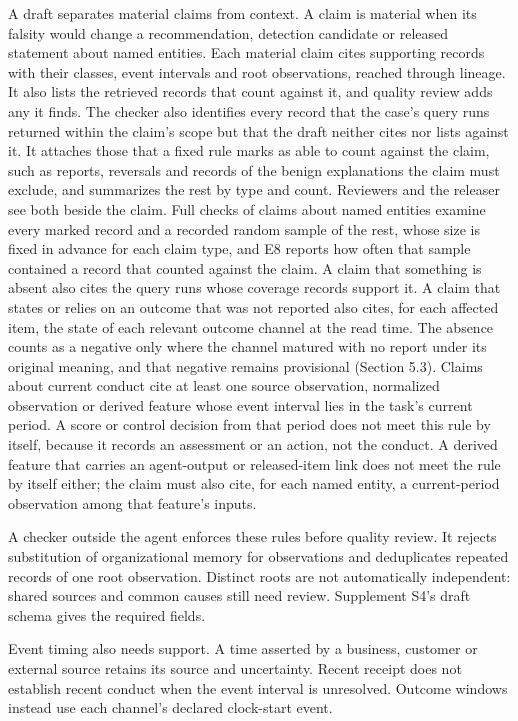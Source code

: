 \documentclass[
  11pt,
]{article}
\begin{document}
A draft separates material claims from context. A claim is material when
its falsity would change a recommendation, detection candidate or
released statement about named entities. Each material claim cites
supporting records with their classes, event intervals and root
observations, reached through lineage. It also lists the retrieved
records that count against it, and quality review adds any it finds. The
checker also identifies every record that the case's query runs returned
within the claim's scope but that the draft neither cites nor lists
against it. It attaches those that a fixed rule marks as able to count
against the claim, such as reports, reversals and records of the benign
explanations the claim must exclude, and summarizes the rest by type and
count. Reviewers and the releaser see both beside the claim. Full checks
of claims about named entities examine every marked record and a
recorded random sample of the rest, whose size is fixed in advance for
each claim type, and E8 reports how often that sample contained a record
that counted against the claim. A claim that something is absent also
cites the query runs whose coverage records support it. A claim that
states or relies on an outcome that was not reported also cites, for
each affected item, the state of each relevant outcome channel at the
read time. The absence counts as a negative only where the channel
matured with no report under its original meaning, and that negative
remains provisional (Section 5.3). Claims about current conduct cite at
least one source observation, normalized observation or derived feature
whose event interval lies in the task's current period. A score or
control decision from that period does not meet this rule by itself,
because it records an assessment or an action, not the conduct. A
derived feature that carries an agent-output or released-item link does
not meet the rule by itself either; the claim must also cite, for each
named entity, a current-period observation among that feature's inputs.

A checker outside the agent enforces these rules before quality review.
It rejects substitution of organizational memory for observations and
deduplicates repeated records of one root observation. Distinct roots
are not automatically independent: shared sources and common causes
still need review. Supplement S4's draft schema gives the required
fields.

Event timing also needs support. A time asserted by a business, customer
or external source retains its source and uncertainty. Recent receipt
does not establish recent conduct when the event interval is unresolved.
Outcome windows instead use each channel's declared clock-start event.
\end{document}
